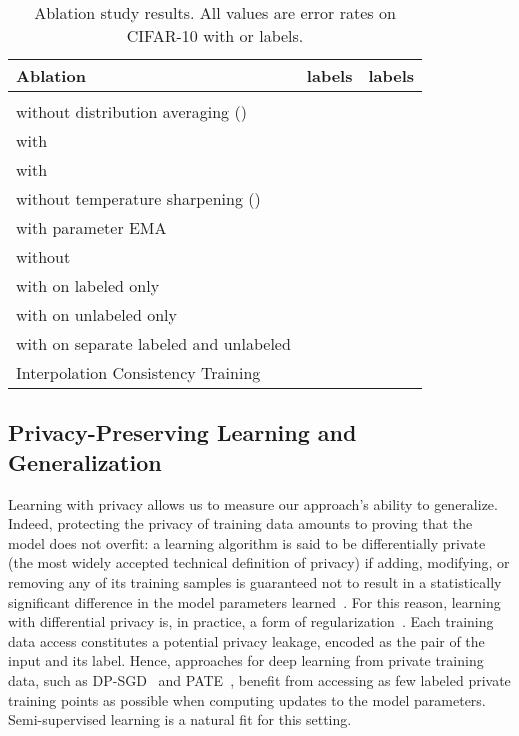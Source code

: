 \documentclass{article}
\begin{document}
\begin{table}
\centering
\begin{tabular}{lrr}
\toprule
Ablation &  labels &  labels \\
\midrule
 &  &  \\
 without distribution averaging () &  &   \\
 with  &  &   \\
 with  &  &   \\
 without temperature sharpening () &  &  \\
 with parameter EMA &  &  \\
 without  &  &  \\
 with  on labeled only &  &  \\
 with  on unlabeled only &  &  \\
 with  on separate labeled and unlabeled &  &  \\
Interpolation Consistency Training \cite{verma2019interpolation} &  &  \\
\bottomrule
\end{tabular}
\vskip 0.1in
\caption{Ablation study results. All values are error rates on CIFAR-10 with  or  labels.
}
\label{tab:ablation}
\vskip -0.2in
\end{table}

\subsection{Privacy-Preserving Learning and Generalization}
\label{sec:dp_experiments}

Learning with privacy allows us to measure our approach's ability to generalize. Indeed, protecting the privacy of training data amounts to proving that the model does not overfit: a learning algorithm is said to be differentially private (the most widely accepted technical definition of privacy) if adding, modifying, or removing any of its training samples is guaranteed not to result in a statistically significant difference in the model parameters learned~\cite{dwork2016calibrating}. For this reason, learning with differential privacy is, in practice, a form of regularization~\cite{nissim2015generalization}.
Each training data access constitutes a potential privacy leakage, encoded as the pair of the input and its label. Hence, approaches for deep learning from private training data, such as DP-SGD~\citep{abadi2016deep} and PATE~\citep{papernot2016semi}, benefit from accessing as few labeled private training points as possible when computing updates to the model parameters. Semi-supervised learning is a natural fit for this setting.
\end{document}
